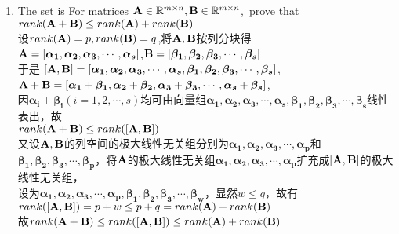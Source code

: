 \documentclass[english,onecolumn,UTF8]{IEEEtran}
\begin{document}
\begin{enumerate}
\begin{enumerate}
	\item The set is For matrices $\bold A \in \mathbb{R}^{m\times n},\bold B \in \mathbb{R}^{m\times n}$,\ prove that $rank(\bold A + \bold B)\le rank(\bold A) +rank(\bold B)$
\\设$rank(\bold A)=p,rank(\bold B)=q$,将$\bold A,\bold B$按列分块得
\\$\bold A= \left[\boldsymbol{\alpha_1},\boldsymbol{\alpha_2},\boldsymbol{\alpha_3}, \cdots ,\boldsymbol{\alpha_s} \right]$,$\bold B= \left[\boldsymbol{\beta_1},\boldsymbol{\beta_2},\boldsymbol{\beta_3}, \cdots ,\boldsymbol{\beta_s} \right]$
\\于是 $\left[ \bold A, \bold B\right] = \left[\boldsymbol{\alpha_1},\boldsymbol{\alpha_2},\boldsymbol{\alpha_3}, \cdots ,\boldsymbol{\alpha_s},\boldsymbol{\beta_1},\boldsymbol{\beta_2},\boldsymbol{\beta_3}, \cdots ,\boldsymbol{\beta_s} \right]$,
\\ $\bold A+ \bold B=\left[\boldsymbol{\alpha_1}+\boldsymbol{\beta_1},\boldsymbol{\alpha_2}+\boldsymbol{\beta_2},\boldsymbol{\alpha_3}+\boldsymbol{\beta_3}, \cdots ,\boldsymbol{\alpha_s}+\boldsymbol{\beta_s}\right]$,
\\因$\boldsymbol{\alpha_i}+\boldsymbol{\beta_i}(i=1,2,\cdots,s)$均可由向量组$\boldsymbol{\alpha_1},\boldsymbol{\alpha_2},\boldsymbol{\alpha_3}, \cdots ,\boldsymbol{\alpha_s},\boldsymbol{\beta_1},\boldsymbol{\beta_2},\boldsymbol{\beta_3}, \cdots ,\boldsymbol{\beta_s}$线性表出，故
\\$rank(\bold A + \bold B)\leq rank(\left[ \bold A, \bold B\right] )$
\\又设$\bold A, \bold B$的列空间的极大线性无关组分别为$\boldsymbol{\alpha_1},\boldsymbol{\alpha_2},\boldsymbol{\alpha_3}, \cdots ,\boldsymbol{\alpha_p}$和$\boldsymbol{\beta_1},\boldsymbol{\beta_2},\boldsymbol{\beta_3}, \cdots ,\boldsymbol{\beta_p}$，将$\bold A$的极大线性无关组$\boldsymbol{\alpha_1},\boldsymbol{\alpha_2},\boldsymbol{\alpha_3}, \cdots ,\boldsymbol{\alpha_p}$扩充成$\left[ \bold A, \bold B\right]$的极大线性无关组，
\\设为$\boldsymbol{\alpha_1},\boldsymbol{\alpha_2},\boldsymbol{\alpha_3}, \cdots ,\boldsymbol{\alpha_p},\boldsymbol{\beta_1},\boldsymbol{\beta_2},\boldsymbol{\beta_3}, \cdots ,\boldsymbol{\beta_w}$，显然$w\leq q$，故有
\\$rank(\left[ \bold A, \bold B\right] )=p+w\leq p+q =rank(\bold A)+rank(\bold B)$
\\故$rank(\bold A + \bold B)\leq rank(\left[ \bold A, \bold B\right] )\leq rank(\bold A)+rank(\bold B)$



\end{enumerate}
\end{enumerate}
\end{document}
